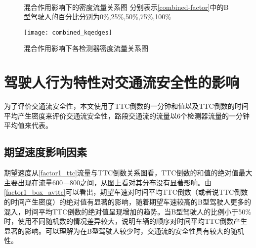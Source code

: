 \begin{figure}[H]%
\centering
{}%
\\%
%
\caption[A set of four sub-floats.]{混合作用影响下的密度流量关系图
分别表示\autoref{combined-factor}中的B型驾驶人的百分比分别为0\%,25\%,50\%,75\%,100\%}%
\label{combined_kq}%
\end{figure}

\begin{figure}[H]
\begin{center}
\texttt{[image: combined\_kqedges]}
\caption{混合作用影响下各检测器密度流量关系图}
\label{combined_kqedges}
\end{center}
\end{figure}

\section{驾驶人行为特性对交通流安全性的影响}

为了评价交通流安全性，本文使用了TTC倒数的一分钟和值以及TTC倒数的时间平均产生密度来评价交通流安全性，路段交通流的流量以6个检测器流量的一分钟平均值来代表。


\subsection{期望速度影响因素}

期望速度从\autoref{factor1_ttc}流量与TTC倒数关系图看，TTC倒数的和值的绝对值最大主要出现在流量600－800之间，从图上看对其分布没有显著影响。由\autoref{factor1_box_avttc}可以看出，期望车速对时间平均TTC倒数（或者说TTC倒数的时间产生密度）的绝对值有显著的影响，随着期望车速较高的B型驾驶人更多的混入，时间平均TTC倒数的绝对值呈现增加的趋势。当B型驾驶人的比例小于50\%时，使用不同随机数的情况差异较大，说明车辆的顺序对时间平均TTC倒数产生显著的影响。可以理解为在B型驾驶人较少时，交通流的安全性具有较大的随机性。

